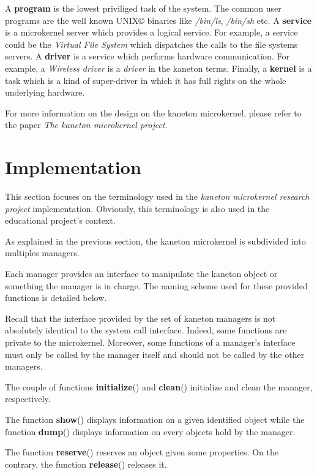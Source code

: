 A \textbf{program} is the lowest priviliged task of the system. The common
user programs are the well known UNIX{\copyright} binaries like
\textit{/bin/ls}, \textit{/bin/sh} etc. A \textbf{service} is a microkernel
server which provides a logical service. For example, a service could be the
\textit{Virtual File System} which dispatches the calls to the file systems
servers. A \textbf{driver} is a service which performs hardware communication.
For example, a \textit{Wireless driver} is a \textit{driver} in the kaneton
terms. Finally, a \textbf{kernel} is a task which is a kind of super-driver
in which it has full rights on the whole underlying hardware.

For more information on the design on the kaneton microkernel, please
refer to the paper \textit{The kaneton microkernel project}.

%
%

\section{Implementation}

This section focuses on the terminology used in the \textit{kaneton microkernel
research project} implementation. Obviously, this terminology is also used
in the educational project's context.

As explained in the previous section, the kaneton microkernel is subdivided
into multiples managers.

Each manager provides an interface to manipulate the kaneton object or
something the manager is in charge. The naming scheme used for these provided
functions is detailed below.

Recall that the interface provided by the set of kaneton managers is not
absolutely identical to the system call interface. Indeed, some functions
are private to the microkernel. Moreover, some functions of a manager's
interface must only be called by the manager itself and should not be called
by the other managers.

The couple of functions \textbf{initialize}() and \textbf{clean}() initialize
and clean the manager, respectively.

The function \textbf{show}() displays information on a given identified object
while the function \textbf{dump}() displays information on every objects
hold by the manager.

The function \textbf{reserve}() reserves an object given some properties. On
the contrary, the function \textbf{release}() releases it.

